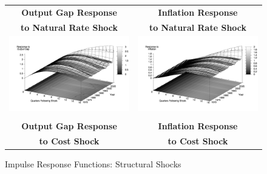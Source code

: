 \documentclass[10pt]{article}
\begin{document}
{\begin{figure}\caption{Impulse Response Functions: Structural Shocks}\label{fg:irf_structural}
\hspace*{-4pc}
\begin{tabular}{cc}\\
\textbf{Output Gap Response} & \textbf{Inflation Response} \\
\textbf{to Natural Rate Shock} & \textbf{to Natural Rate Shock}  \\
\includegraphics[scale=0.12]{images/Irf16_Output_Gap_Natural_Rate_Shock.png} & \includegraphics[scale=0.12]{images/Irf16_Inflation_Natural_Rate_Shock.png} \\\\
\textbf{Output Gap Response} & \textbf{Inflation Response} \\
\textbf{to Cost Shock} & \textbf{to Cost Shock}  \\

\end{tabular}
\end{figure}}
\end{document}
